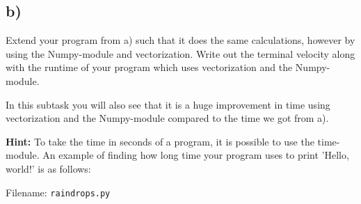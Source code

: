 \documentclass[10pt,a4paper]{article}
\begin{document}
\subsection*{b)}
Extend your program from a) such that it does the same calculations, however by using the Numpy-module and vectorization. 
Write out the terminal velocity along with the runtime of your program which uses vectorization and the Numpy-module. 

In this subtask you will also see that it is a huge improvement in time using vectorization and the Numpy-module compared to the time we got from a). 

\textbf{Hint:} To take the time in seconds of a program, it is possible to use the time-module. An example of finding how long time your program uses to print 'Hello, world!' is as follows:


Filename: \texttt{raindrops.py}
\end{document}
